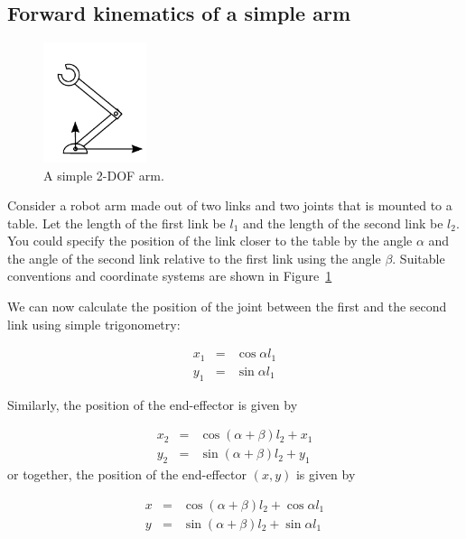 \subsection{Forward kinematics of a simple arm}
\begin{figure}[!htb]%
  \begin{center}
    \includegraphics[width=0.27\textwidth]{figs/fwk2dofarm}
  \end{center}
  \caption{A simple 2-DOF arm.\label{fig:fwk2dofarm}}
\end{figure}

Consider a robot arm made out of two links and two joints that is mounted to a table. Let the length of the first link be $l_1$ and the length of the second link be $ l_2$. You could specify the position of the link closer to the table by the angle $ \alpha$ and the angle of the second link relative to the first link using the angle $ \beta$. Suitable conventions and coordinate systems are shown in Figure~\ref{fig:fwk2dofarm}

We can now calculate the position of the joint between the first and the second link using simple trigonometry:

\begin{eqnarray}\label{eq:cosxl1}
x_1 &=&\cos \alpha l_1\\
y_1 &=&\sin \alpha l_1
\end{eqnarray}

Similarly, the position of the end-effector is given by

\begin{eqnarray}
x_2&=&\cos(\alpha+\beta)l_2+x_1\\
y_2&=&\sin(\alpha+\beta)l_2+y_1
\end{eqnarray}
%
or together, the position of the end-effector $(x,y)$ is given by

\begin{eqnarray}\label{eq:cosx}
x&=&\cos(\alpha+\beta)l_2+\cos\alpha l_1\\
y&=&\sin(\alpha+\beta)l_2+\sin\alpha l_1
\end{eqnarray}

